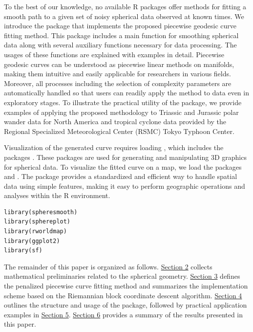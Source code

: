 To the best of our knowledge, no available R packages offer methods for fitting a smooth path to a given set of noisy spherical data observed at known times. We introduce the  package that implements the proposed piecewise geodesic curve fitting method. This package includes a main function for smoothing spherical data along with several auxiliary functions necessary for data processing. The usages of these functions are explained with examples in detail. Piecewise geodesic curves can be understood as piecewise linear methods on manifolds, making them intuitive and easily applicable for researchers in various fields. Moreover, all processes including the selection of complexity parameters are automatically handled so that users can readily apply the method to data even in exploratory stages. To illustrate the practical utility of the  package, we provide examples of applying the proposed methodology to Triassic and Jurassic polar wander data for North America \citep{kent2010influence} and tropical cyclone data provided by the Regional Specialized Meteorological Center (RSMC) Tokyo Typhoon Center.

Visualization of the generated curve requires loading  \citep{sphereplot-ref}, which includes the packages  \citep{rgl-ref}. These packages are used for generating and manipulating 3D graphics for spherical data. To visualize the fitted curve on a map, we load the packages  \citep{rworldmap-ref} and  \citep{ggplot2-ref}.
The  package provides a standardized and efficient way to handle spatial data using simple features, making it easy to perform geographic operations and analyses within the R environment.

\begin{verbatim}
library(spheresmooth)
library(sphereplot)
library(rworldmap)
library(ggplot2)
library(sf)
\end{verbatim}

The remainder of this paper is organized as follows. \hyperref[prelim]{Section 2} collects mathematical preliminaries related to the spherical geometry. \hyperref[ppgc]{Section 3} defines the penalized piecewise curve fitting method and summarizes the implementation scheme based on the Riemannian block coordinate descent algorithm. \hyperref[package]{Section 4} outlines the structure and usage of the  package, followed by practical application examples in \hyperref[application]{Section 5}. \hyperref[conclusion]{Section 6} provides a summary of the results presented in this paper.

